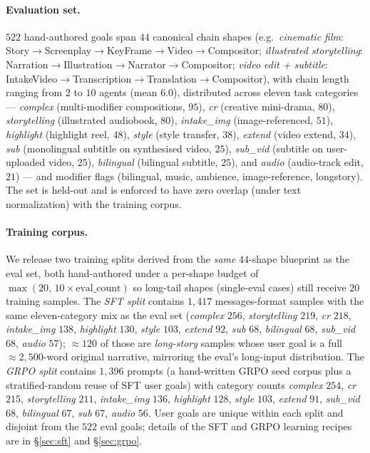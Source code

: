 \paragraph{Evaluation set.}
$522$ hand-authored goals span $44$ canonical chain shapes
(e.g.\ \emph{cinematic film}: Story$\to$Screenplay$\to$KeyFrame$\to$Video$\to$Compositor;
\emph{illustrated storytelling}: Narration$\to$Illustration$\to$Narrator$\to$Compositor;
\emph{video edit + subtitle}: IntakeVideo$\to$Transcription$\to$Translation$\to$Compositor),
with chain length ranging from $2$ to $10$ agents (mean $6.0$),
distributed across eleven task categories — \emph{complex}
(multi-modifier compositions, $95$), \emph{cr} (creative mini-drama,
$80$), \emph{storytelling} (illustrated audiobook, $80$),
\emph{intake\_img} (image-referenced, $51$), \emph{highlight}
(highlight reel, $48$), \emph{style} (style transfer, $38$),
\emph{extend} (video extend, $34$), \emph{sub} (monolingual subtitle
on synthesised video, $25$), \emph{sub\_vid} (subtitle on
user-uploaded video, $25$), \emph{bilingual} (bilingual subtitle,
$25$), and \emph{audio} (audio-track edit, $21$) — and modifier
flags (bilingual, music, ambience, image-reference, longstory). The
set is held-out and is enforced to have zero overlap (under text
normalization) with the training corpus.

\paragraph{Training corpus.}
We release two training splits derived from the \emph{same}
$44$-shape blueprint as the eval set, both hand-authored under a
per-shape budget of $\max(20,\,10\!\times\!\text{eval\_count})$ so
long-tail shapes (single-eval cases) still receive $20$ training
samples. The \emph{SFT split} contains $1{,}417$ messages-format
samples with the same eleven-category mix as the eval set
(\emph{complex} $256$, \emph{storytelling} $219$, \emph{cr} $218$,
\emph{intake\_img} $138$, \emph{highlight} $130$, \emph{style}
$103$, \emph{extend} $92$, \emph{sub} $68$, \emph{bilingual} $68$,
\emph{sub\_vid} $68$, \emph{audio} $57$); $\approx 120$ of those are
\emph{long-story} samples whose user goal is a full $\approx
2{,}500$-word original narrative, mirroring the eval's long-input
distribution. The \emph{GRPO split} contains $1{,}396$ prompts (a
hand-written GRPO seed corpus plus a stratified-random reuse of SFT
user goals) with category counts \emph{complex} $254$, \emph{cr}
$215$, \emph{storytelling} $211$, \emph{intake\_img} $136$,
\emph{highlight} $128$, \emph{style} $103$, \emph{extend} $91$,
\emph{sub\_vid} $68$, \emph{bilingual} $67$, \emph{sub} $67$,
\emph{audio} $56$. User goals are unique within each split and
disjoint from the $522$ eval goals; details of the SFT and GRPO
learning recipes are in \S\ref{sec:sft} and \S\ref{sec:grpo}.

